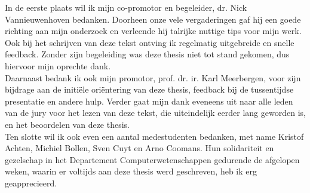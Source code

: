 \documentclass[master=cws,masteroption=ci]{kulemt}
\begin{document}
\begin{preface}
In de eerste plaats wil ik mijn co-promotor en begeleider, dr. Nick Vannieuwenhoven bedanken. Doorheen onze vele vergaderingen gaf hij een goede richting aan mijn onderzoek en verleende hij talrijke nuttige tips voor mijn werk. Ook bij het schrijven van deze tekst ontving ik regelmatig uitgebreide en snelle feedback. Zonder zijn begeleiding was deze thesis niet tot stand gekomen, dus hiervoor mijn oprechte dank.\\

Daarnaast bedank ik ook mijn promotor, prof. dr. ir. Karl Meerbergen, voor zijn bijdrage aan de initi\"ele ori\"entering van deze thesis, feedback bij de tussentijdse presentatie en andere hulp. Verder gaat mijn dank eveneens uit naar alle leden van de jury voor het lezen van deze tekst, die uiteindelijk eerder lang geworden is, en het beoordelen van deze thesis.\\

Ten slotte wil ik ook even een aantal medestudenten bedanken, met name Kristof Achten, Michiel Bollen, Sven Cuyt en Arno Coomans. Hun solidariteit en gezelschap in het Departement Computerwetenschappen gedurende de afgelopen weken, waarin er voltijds aan deze thesis werd geschreven, heb ik erg geapprecieerd.
\end{preface}

\tableofcontents*
\end{document}
